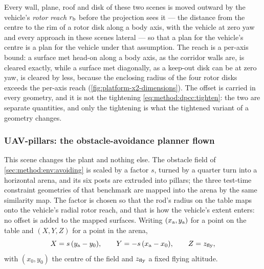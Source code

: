 Every wall, plane, roof and disk of these two scenes is moved outward by the vehicle's \emph{rotor
reach} $r_{\textrm{b}}$ before the projection sees it --- the distance from the centre to the rim of a rotor
disk along a body axis, with the vehicle at zero yaw and every approach in these scenes lateral --- so
that a plan for the vehicle's centre is a plan for the vehicle under that assumption. The reach is a per-axis
bound: a surface met head-on along a body axis, as the corridor walls are, is cleared exactly, while a surface
met diagonally, as a keep-out disk can be at zero yaw, is cleared by less, because the enclosing radius of the
four rotor disks exceeds the per-axis reach (\autoref{fig:platform-x2-dimensions}). The offset is
carried in every geometry, and it is not the tightening \eqref{eq:method:dpcc:tighten}: the two are
separate quantities, and only the tightening is what the tightened variant of a geometry changes.

\subsubsection*{UAV-pillars: the obstacle-avoidance planner flown}

This scene changes the plant and nothing else. The obstacle field of \autoref{sec:method:env:avoiding}
is scaled by a factor $s$, turned by a quarter turn into a horizontal arena, and its six posts are
extruded into pillars; the three test-time constraint geometries of that benchmark are mapped into the
arena by the same similarity map. The factor is chosen so that the rod's radius on the table maps onto
the vehicle's radial rotor reach, and that is how the vehicle's extent enters: no offset is added to the
mapped surfaces. Writing $(x_{\textrm{a}},y_{\textrm{a}})$ for a point on the table and $(X,Y,Z)$ for a point in
the arena,
\begin{equation}\label{eq:method:env:pillarsmap}
  X = s\,(y_{\textrm{a}}-y_{0}),
  \qquad
  Y = -s\,(x_{\textrm{a}}-x_{0}),
  \qquad
  Z = z_{\textrm{fly}},
\end{equation}
with $(x_{0},y_{0})$ the centre of the field and $z_{\textrm{fly}}$ a fixed flying altitude.


